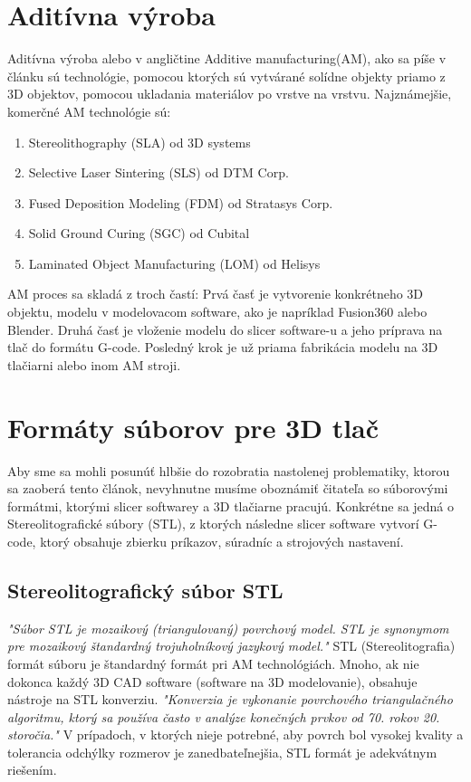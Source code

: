 \documentclass[10pt,twoside,slovak,a4paper]{article}
\begin{document}
\section{Aditívna výroba}\label{AM}
    Aditívna výroba alebo v angličtine Additive manufacturing(AM), ako sa píše v článku \cite{inproceedings} sú technológie, pomocou ktorých sú vytvárané solídne objekty priamo z 3D objektov, pomocou ukladania materiálov  po vrstve na vrstvu. 
    Najznámejšie, komerčné AM technológie sú:
\newpage
\begin{enumerate}
    \item Stereolithography (SLA) od 3D systems
    \item Selective Laser Sintering  (SLS) od DTM Corp.
    \item Fused  Deposition  Modeling (FDM) od Stratasys  Corp.
    \item Solid  Ground  Curing  (SGC)  od Cubital
    \item Laminated Object Manufacturing (LOM) od Helisys
\end{enumerate}
    \cite{6757836} AM proces sa skladá z troch častí: Prvá časť je vytvorenie konkrétneho 3D objektu, modelu v modelovacom software, ako je napríklad Fusion360 alebo Blender. Druhá časť je vloženie modelu do slicer software-u a jeho príprava na tlač do formátu G-code. Posledný krok je už priama fabrikácia modelu na 3D tlačiarni alebo inom AM stroji.

\section{Formáty súborov pre 3D tlač}
    Aby sme sa mohli posunúť hlbšie do rozobratia nastolenej problematiky, ktorou sa zaoberá tento článok, nevyhnutne musíme oboznámiť čitateľa so súborovými formátmi, ktorými slicer softwarey a 3D tlačiarne pracujú. Konkrétne sa jedná o Stereolitografické súbory (STL), z ktorých následne slicer software vytvorí G-code, ktorý obsahuje zbierku príkazov, súradníc a strojových nastavení.

\subsection{Stereolitografický súbor STL}\label{formaty:STL}
    \cite{6757836} \emph{"Súbor STL je mozaikový (triangulovaný) povrchový model. STL je synonymom pre mozaikový štandardný trojuholníkový jazykový model."}
    \cite{inproceedings} STL (Stereolitografia) formát súboru je štandardný formát pri AM technológiách. Mnoho, ak nie dokonca každý 3D CAD software (software na 3D modelovanie), obsahuje nástroje na STL konverziu.
    \emph{"Konverzia je vykonanie povrchového triangulačného algoritmu, ktorý sa používa často v analýze konečných prvkov od 70. rokov 20. storočia."}
    V prípadoch, v ktorých nieje potrebné, aby povrch bol vysokej kvality a tolerancia odchýlky rozmerov je zanedbateľnejšia, STL formát je adekvátnym riešením.
\end{document}
